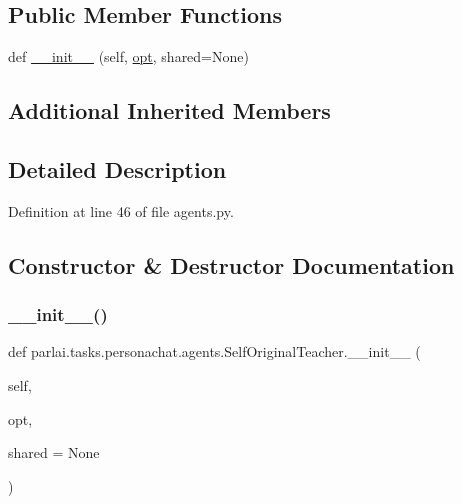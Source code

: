 \subsection*{Public Member Functions}
\begin{DoxyCompactItemize}
\item 
def \hyperlink{classparlai_1_1tasks_1_1personachat_1_1agents_1_1SelfOriginalTeacher_af64af069e88580a3365782e747637a01}{\+\_\+\+\_\+init\+\_\+\+\_\+} (self, \hyperlink{classparlai_1_1core_1_1teachers_1_1FbDialogTeacher_af7a9ec497b9cd0292d7b8fa220da7c28}{opt}, shared=None)
\end{DoxyCompactItemize}
\subsection*{Additional Inherited Members}


\subsection{Detailed Description}


Definition at line 46 of file agents.\+py.



\subsection{Constructor \& Destructor Documentation}
\mbox{\label{classparlai_1_1tasks_1_1personachat_1_1agents_1_1SelfOriginalTeacher_af64af069e88580a3365782e747637a01}} 
\subsubsection{\texorpdfstring{\+\_\+\+\_\+init\+\_\+\+\_\+()}{\_\_init\_\_()}}
{\footnotesize\ttfamily def parlai.\+tasks.\+personachat.\+agents.\+Self\+Original\+Teacher.\+\_\+\+\_\+init\+\_\+\+\_\+ (\begin{DoxyParamCaption}\item[{}]{self,  }\item[{}]{opt,  }\item[{}]{shared = {\ttfamily None} }\end{DoxyParamCaption})}



